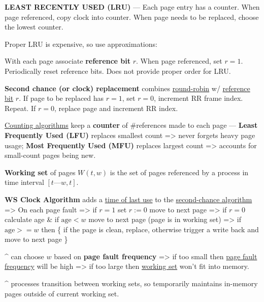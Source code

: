 \textbf{LEAST RECENTLY USED (LRU)} — Each page entry has a counter. When page referenced, copy clock into counter.
When page needs to be replaced, choose the lowest counter.

Proper LRU is expensive, so use approximations:
\begin{enumerate}
    \vItem With each page associate \textbf{reference bit} $r$. When page referenced, set $r = 1$. Periodically reset reference bits.
    Does not provide proper order for LRU.

    \vItem \textbf{Second chance (or clock) replacement} combines \ul{round-robin} w/ \ul{reference bit} $r$. If page to be replaced has
    $r = 1$, set $r = 0$, increment RR frame index. Repeat. If $r = 0$, replace page and increment RR index.
\end{enumerate}

\ul{Counting algorithms} keep a \textbf{counter} of \#references made to each page — 
\textbf{Least Frequently Used (LFU)} replaces smallest count => never forgets heavy page usage;
\textbf{Most Frequently Used (MFU)} replaces largest count => accounts for small-count pages being new.


\hSep

\textbf{Working set} of pages $W(t, w)$ is the set of pages referenced by a process in time interval $[t — w, t]$.

\textbf{WS Clock Algorithm} adds a \ul{time of last use} to the \ul{second-chance algorithm} =>
On each page fault => if $r=1$ set $r:=0$ move to next page =>
if $r=0$ calculate age \& if $\mathrm{age} < w$ move to next page (page is in working set) =>
if $\mathrm{age} >= w$ then 
\{ if the page is clean, replace, otherwise trigger a write back and move to next page \}

\^{} can choose $w$ based on \textbf{page fault frequency} => if too small then \ul{page fault frequency} will be high =>
if too large then \ul{working set} won't fit into memory.

\^{} processes transition between working sets, so temporarily maintains in-memory pages outside of current working set.


\hSep
